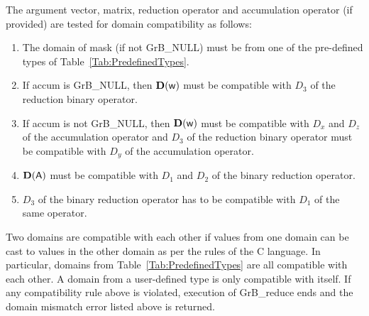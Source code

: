 The argument vector, matrix, reduction operator and accumulation 
operator (if provided) are tested for domain compatibility as follows:
\begin{enumerate}
	\item The domain of {\sf mask} (if not {\sf GrB\_NULL}) must be from one of 
    the pre-defined types of Table~\ref{Tab:PredefinedTypes}.

	\item If {\sf accum} is {\sf GrB\_NULL}, then $\bold{D}({\sf w})$ must be 
    compatible with $D_3$ of the reduction binary operator.

	\item If {\sf accum} is not {\sf GrB\_NULL}, then $\bold{D}({\sf w})$ must be
    compatible with $D_x$ and $D_z$ of the accumulation operator and 
    $D_3$ of the reduction binary operator must be compatible with $D_y$ of the accumulation operator.

	\item $\bold{D}({\sf A})$ must be compatible with $D_1$ and $D_2$ of the binary reduction operator.

        \item $D_3$ of the binary reduction operator has to be compatible with $D_1$ of the same operator.
\end{enumerate}
Two domains are compatible with each other if values from one domain can be cast 
to values in the other domain as per the rules of the C language.
In particular, domains from Table~\ref{Tab:PredefinedTypes} are all compatible 
with each other. A domain from a user-defined type is only compatible with itself.
If any compatibility rule above is violated, execution of {\sf GrB\_reduce} ends
and the domain mismatch error listed above is returned.

